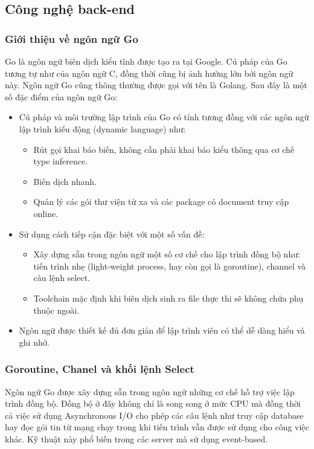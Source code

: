 \subsection{Công nghệ back-end}
\subsubsection{Giới thiệu về ngôn ngữ Go}
Go là ngôn ngữ biên dịch kiểu tĩnh được tạo ra tại Google.
Cú pháp của Go tương tự như của ngôn ngữ C, đồng thời cũng
bị ảnh hưởng lớn bởi ngôn ngữ này. Ngôn ngữ Go cũng thông
thường được gọi với tên là Golang.
Sau đây là một số đặc điểm của ngôn ngữ Go:
\begin{itemize}[topsep=0ex]
\item Cú pháp và môi trường lập trình của Go có
    tính tương đồng với các ngôn ngữ lập trình
    kiểu động (dynamic language) như:
    \begin{itemize}[topsep=0ex]
    \item Rút gọi khai báo biến, không cần phải khai báo kiểu
        thông qua cơ chế type inference.
    \item Biên dịch nhanh.
    \item Quản lý các gói thư viện từ xa và các
        package có document truy cập online.
    \end{itemize}

\item Sử dụng cách tiếp cận đặc biệt với một số vấn đề:
    \begin{itemize}[topsep=0ex]
    \item Xây dựng sẵn trong ngôn ngữ một số cơ chế cho lập trình
        đồng bộ như: tiến trình nhẹ (light-weight process,
        hay còn gọi là goroutine), channel và câu lệnh select.
    \item Toolchain mặc định khi biên dịch sinh ra file thực
        thi sẽ không chứa phụ thuộc ngoài.
    \end{itemize}

\item Ngôn ngữ được thiết kế đủ đơn giản để lập trình
    viên có thể dễ dàng hiểu và ghi nhớ.
\end{itemize}

\subsubsection{Goroutine, Chanel và khối lệnh Select}
Ngôn ngữ Go được xây dựng sẵn trong ngôn ngữ những cơ chế hỗ trợ việc
lập trình đồng bộ. Đồng bộ ở đây không chỉ là song song ở mức CPU mà
đồng thời cả việc sử dụng Asynchronous I/O cho phép các câu lệnh như
truy cập database hay đọc gói tin từ mạng chạy trong khi tiến
trình vẫn được sử dụng cho công việc khác. Kỹ thuật này phổ biến
trong các server mà sử dụng event-based.


